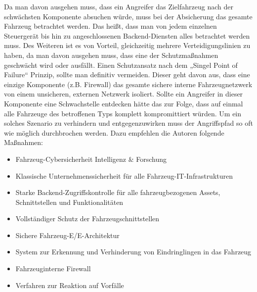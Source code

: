 Da man davon ausgehen muss, dass ein Angreifer das Zielfahrzeug nach der 
schwächsten Komponente absuchen würde, muss bei der Absicherung das gesamte 
Fahrzeug betrachtet werden. Das heißt, dass man von jedem einzelnen Steuergerät 
bis hin zu angeschlossenen Backend-Diensten alles betrachtet werden muss. 
\newline
Des Weiteren ist es von Vorteil, gleichzeitig mehrere Verteidigungslinien zu haben, 
da man davon ausgehen muss, dass eine der Schutzmaßnahmen geschwächt wird oder ausfällt.
\newline
Einen Schutzansatz nach dem „Singel Point of Failure“ Prinzip, sollte man definitiv 
vermeiden. Dieser geht davon aus, dass eine einzige Komponente (z.B. Firewall) das 
gesamte sichere interne Fahrzeugnetzwerk von einem unsicheren, externen Netzwerk isoliert. 
Sollte ein Angreifer in dieser Komponente eine Schwachstelle entdecken hätte das zur 
Folge, dass auf einmal alle Fahrzeuge des betroffenen Typs komplett kompromittiert würden. 
\newline
Um ein solches Szenario zu verhindern und entgegenzuwirken muss der Angriffspfad so 
oft wie möglich durchbrochen werden. Dazu empfehlen die Autoren folgende Maßnahmen:

\begin{itemize}
    \item Fahrzeug-Cybersicherheit Intelligenz $\&$ Forschung
    \item Klassische Unternehmenssicherheit für alle Fahrzeug-IT-Infrastrukturen
    \item Starke Backend-Zugriffskontrolle für alle fahrzeugbezogenen Assets, Schnittstellen 
    und Funktionalitäten
    \item Vollständiger Schutz der Fahrzeugschnittstellen
    \item Sichere Fahrzeug-E/E-Architektur
    \item System zur Erkennung und Verhinderung von Eindringlingen in das Fahrzeug
    \item Fahrzeuginterne Firewall
    \item Verfahren zur Reaktion auf Vorfälle
\end{itemize}
